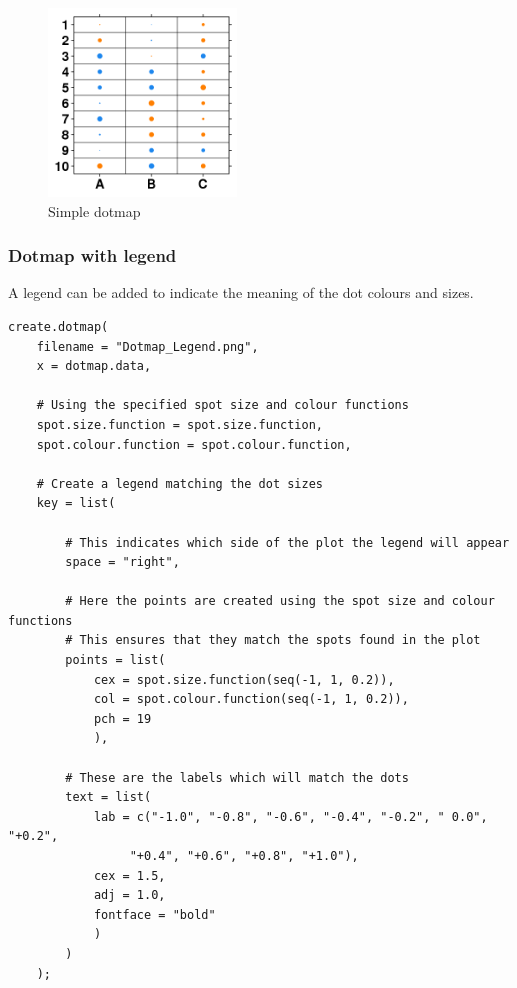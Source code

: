 \documentclass[letterpaper]{article}
\begin{document}
\begin{figure}[!ht]
  \begin{center}
     \includegraphics[width=50mm]{Figures/Dotmap_Simple.png}
     \caption{Simple dotmap}
  \end{center}
\end{figure}

\subsubsection{Dotmap with legend}
A legend can be added to indicate the meaning of the dot colours and sizes.

\begin{verbatim}
create.dotmap(
    filename = "Dotmap_Legend.png",
    x = dotmap.data,
    
    # Using the specified spot size and colour functions
    spot.size.function = spot.size.function,
    spot.colour.function = spot.colour.function,    
    
    # Create a legend matching the dot sizes
    key = list(
    
        # This indicates which side of the plot the legend will appear
        space = "right",
        
        # Here the points are created using the spot size and colour functions
        # This ensures that they match the spots found in the plot
        points = list(
            cex = spot.size.function(seq(-1, 1, 0.2)),
            col = spot.colour.function(seq(-1, 1, 0.2)),
            pch = 19
            ),
        
        # These are the labels which will match the dots
        text = list(
            lab = c("-1.0", "-0.8", "-0.6", "-0.4", "-0.2", " 0.0", "+0.2",
                 "+0.4", "+0.6", "+0.8", "+1.0"),
            cex = 1.5,
            adj = 1.0,
            fontface = "bold"
            )
        )
    );
\end{verbatim}
\end{document}
